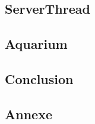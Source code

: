 \documentclass[a4paper, 12pt]{report}
\begin{document}
\begin{spacing}{1.3}
		\textcolor{colortitre3}{\subsection*{ServerThread}}    

		\textcolor{colortitre3}{\subsection*{}}    
		
		\textcolor{colortitre3}{\subsection*{Aquarium}}    
\textcolor{colortitre1}{\section*{}} 

	\textcolor{colortitre2}{\subsection*{}}    


\textcolor{colortitre1}{\section*{}} 

\textcolor{colortitre1}{\section*{Conclusion}} 

\newpage
\textcolor{colortitre1}{\section*{Annexe}}   

	
	
	
	\end{spacing}
\end{document}
